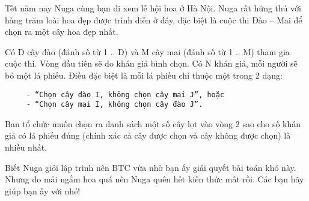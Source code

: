 Tết năm nay Nuga cùng bạn đi xem lễ hội hoa ở Hà Nội. Nuga rất hứng thú với hàng trăm loài hoa đẹp được trình diễn ở đây, đặc biệt là cuộc thi Đào – Mai để chọn ra một cây hoa đẹp nhất.  

   Có D cây đào (đánh số từ 1 .. D) và M cây mai (đánh số từ 1 .. M) tham gia cuộc thi. Vòng đầu tiên sẽ do khán giả bình chọn. Có N khán giả, mỗi người sẽ bỏ một lá phiếu. Điều đặc biệt là mỗi lá phiếu chỉ thuộc một trong 2 dạng:  
\begin{verbatim}
     - “Chọn cây đào I, không chọn cây mai J”, hoặc
     - “Chọn cây mai I, không chọn cây đào J”.
\end{verbatim}



   Ban tổ chức muốn chọn ra danh sách một số cây lọt vào vòng 2 sao cho số khán giả có lá phiếu đúng (chính xác cả cây được chọn và cây không được chọn) là nhiều nhất.  

   Biết Nuga giỏi lập trình nên BTC vừa nhờ bạn ấy giải quyết bài toán khó này. Nhưng do mải ngắm hoa quá nên Nuga quên hết kiến thức mất rồi. Các bạn hãy giúp bạn ấy với nhé!